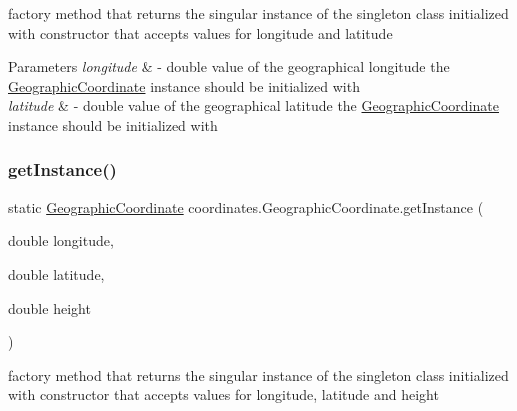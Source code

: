 factory method that returns the singular instance of the singleton class initialized with constructor that accepts values for longitude and latitude 


\begin{DoxyParams}{Parameters}
{\em longitude} & -\/ double value of the geographical longitude the \hyperlink{classcoordinates_1_1_geographic_coordinate}{Geographic\+Coordinate} instance should be initialized with \\
\hline
{\em latitude} & -\/ double value of the geographical latitude the \hyperlink{classcoordinates_1_1_geographic_coordinate}{Geographic\+Coordinate} instance should be initialized with \\
\hline
\end{DoxyParams}
\mbox{\label{classcoordinates_1_1_geographic_coordinate_afa986233325df2fb8a8b47d4ddeaee46}} 
\subsubsection{\texorpdfstring{get\+Instance()}{getInstance()}\hspace{0.1cm}{\footnotesize\ttfamily [3/3]}}
{\footnotesize\ttfamily static \hyperlink{classcoordinates_1_1_geographic_coordinate}{Geographic\+Coordinate} coordinates.\+Geographic\+Coordinate.\+get\+Instance (\begin{DoxyParamCaption}\item[{double}]{longitude,  }\item[{double}]{latitude,  }\item[{double}]{height }\end{DoxyParamCaption})\hspace{0.3cm}{\ttfamily [static]}}



factory method that returns the singular instance of the singleton class initialized with constructor that accepts values for longitude, latitude and height 


